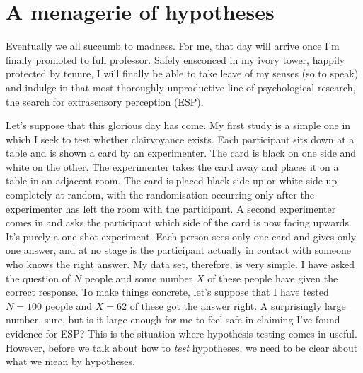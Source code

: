 \section{A menagerie of hypotheses~\label{sec:hypotheses}}

Eventually we all succumb to madness. For me, that day will arrive once I'm finally promoted to full professor. Safely ensconced in my ivory tower, happily protected by tenure, I will finally be able to take leave of my senses (so to speak) and  indulge in that most thoroughly unproductive line of psychological research, the search for extrasensory perception (ESP). 

Let's suppose that this glorious day has come. My first study is a simple one in which I seek to test whether clairvoyance exists. Each participant sits down at a table and is shown a card by an experimenter. The card is black on one side and white on the other. The experimenter takes the card away and places it on a table in an adjacent room. The card is placed black side up or white side up completely at random, with the randomisation occurring only after the experimenter has left the room with the participant. A second experimenter comes in and asks the participant which side of the card is now facing upwards. It's purely a one-shot experiment. Each person sees only one card and gives only one answer, and at no stage is the participant actually in contact with someone who knows the right answer. My data set, therefore, is very simple. I have asked the question of $N$ people and some number $X$ of these people have given the correct response. To make things concrete, let's suppose that I have tested $N = 100$ people and $X = 62$ of these got the answer right. A surprisingly large number, sure, but is it large enough for me to feel safe in claiming I've found evidence for ESP? This is the situation where hypothesis testing comes in useful. However, before we talk about how to {\it test} hypotheses, we need to be clear about what we mean by hypotheses.


